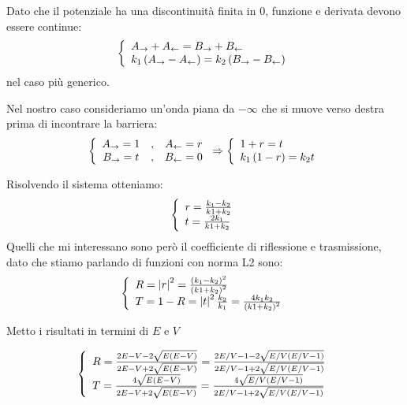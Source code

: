 Dato che il potenziale ha una discontinuit\`a finita in $0$, funzione e derivata devono essere continue:
\begin{equation}
\lr\{.{\begin{array}{l}
	A_\to+A_\from = B_\to+B_\from\\
	k_1\lrt{A_\to-A_\from} = k_2\lrt{B_\to-B_\from}
	\end{array}}
\end{equation}
nel caso pi\`u generico.

Nel nostro caso consideriamo un'onda piana da $-\infty$ che si muove verso destra prima di incontrare la barriera:
\begin{equation}
\lr\{.{\begin{array}{ccc}
	A_\to = 1&,&
	A_\from = r\\
	B_\to = t&,&
	B_\from=0
	\end{array}} \Rightarrow\lr\{.{\begin{array}{l}
	1+r = t\\
	k_1 \lrt{1-r} = k_2 t
	\end{array}}
\end{equation}

Risolvendo il sistema otteniamo:
\begin{equation}
	\lr\{.{\begin{array}{l}
		r = \frac{k_1-k_2}{k1+k_2}\\
		t = \frac{2k_1}{k1+k_2}
	\end{array}}
\end{equation}
Quelli che mi interessano sono per\`o il coefficiente di riflessione e trasmissione, dato che stiamo parlando di funzioni con norma L2 sono:
\begin{equation}
\lr\{.{\begin{array}{l}
	R = \lr||{r}^2 = \frac{\lrt{k_1-k_2}^2}{\lrt{k1+k_2}^2}\\
	T = 1-R = \lr||{t}^2\frac{k_2}{k_1} = \frac{4 k_1 k_2}{\lrt{k1+k_2}^2}
	\end{array}}
\end{equation}

Metto i risultati in termini di $E$ e $V$

\begin{equation}\label{eq:riflessioneStepvanilla}
\lr\{.{\begin{array}{l}
	R =  \frac{2E -V -2 \sqrt{E\lrt{E-V}}}{2E -V +2 \sqrt{E\lrt{E-V}}} = \frac{2E/V -1 -2 \sqrt{E/V\lrt{E/V-1}}}{2E/V -1 +2 \sqrt{E/V\lrt{E/V-1}}}\\
	T =  \frac{4 \sqrt{E\lrt{E-V}}}{2E -V +2 \sqrt{E\lrt{E-V}}} = \frac{4 \sqrt{E/V\lrt{E/V-1}}}{2E/V -1 +2 \sqrt{E/V\lrt{E/V-1}}}
	\end{array}}
\end{equation}

